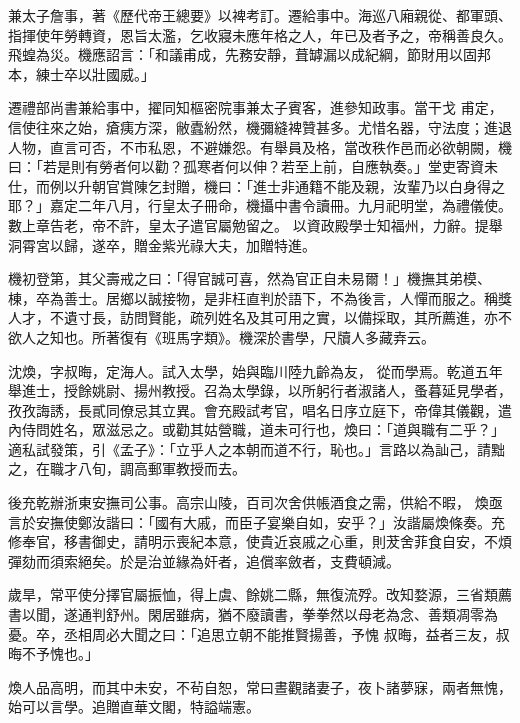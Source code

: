 \begin{pinyinscope}
 兼太子詹事，著《歷代帝王總要》以裨考訂。遷給事中。海巡八廂親從、都軍頭、指揮使年勞轉資，恩旨太濫，乞收寢未應年格之人，年已及者予之，帝稱善良久。飛蝗為災。機應詔言：「和議甫成，先務安靜，葺罅漏以成紀綱，節財用以固邦本，練士卒以壯國威。」



 遷禮部尚書兼給事中，擢同知樞密院事兼太子賓客，進參知政事。當干戈
 甫定，信使往來之始，瘡痍方深，敝蠹紛然，機彌縫裨贊甚多。尤惜名器，守法度；進退人物，直言可否，不市私恩，不避嫌怨。有舉員及格，當改秩作邑而必欲朝闕，機曰：「若是則有勞者何以勸？孤寒者何以伸？若至上前，自應執奏。」堂吏寄資未仕，而例以升朝官賞陳乞封贈，機曰：「進士非通籍不能及親，汝輩乃以白身得之耶？」嘉定二年八月，行皇太子冊命，機攝中書令讀冊。九月祀明堂，為禮儀使。數上章告老，帝不許，皇太子遣官屬勉留之。
 以資政殿學士知福州，力辭。提舉洞霄宮以歸，遂卒，贈金紫光祿大夫，加贈特進。



 機初登第，其父壽戒之曰：「得官誠可喜，然為官正自未易爾！」機撫其弟模、棟，卒為善士。居鄉以誠接物，是非枉直判於語下，不為後言，人憚而服之。稱獎人才，不遺寸長，訪問賢能，疏列姓名及其可用之實，以備採取，其所薦進，亦不欲人之知也。所著復有《班馬字類》。機深於書學，尺牘人多藏弆云。



 沈煥，字叔晦，定海人。試入太學，始與臨川陸九齡為友，
 從而學焉。乾道五年舉進士，授餘姚尉、揚州教授。召為太學錄，以所躬行者淑諸人，蚤暮延見學者，孜孜誨誘，長貳同僚忌其立異。會充殿試考官，唱名日序立庭下，帝偉其儀觀，遣內侍問姓名，眾滋忌之。或勸其姑營職，道未可行也，煥曰：「道與職有二乎？」適私試發策，引《孟子》：「立乎人之本朝而道不行，恥也。」言路以為訕己，請黜之，在職才八旬，調高郵軍教授而去。



 後充乾辦浙東安撫司公事。高宗山陵，百司次舍供帳酒食之需，供給不暇，
 煥亟言於安撫使鄭汝諧曰：「國有大戚，而臣子宴樂自如，安乎？」汝諧屬煥條奏。充修奉官，移書御史，請明示喪紀本意，使貴近哀戚之心重，則茇舍菲食自安，不煩彈劾而須索絕矣。於是治並緣為奸者，追償率斂者，支費頓減。



 歲旱，常平使分擇官屬振恤，得上虞、餘姚二縣，無復流殍。改知婺源，三省類薦書以聞，遂通判舒州。閑居雖病，猶不廢讀書，拳拳然以母老為念、善類凋零為憂。卒，丞相周必大聞之曰：「追思立朝不能推賢揚善，予愧
 叔晦，益者三友，叔晦不予愧也。」



 煥人品高明，而其中未安，不茍自恕，常曰晝觀諸妻子，夜卜諸夢寐，兩者無愧，始可以言學。追贈直華文閣，特謚端憲。




\end{pinyinscope}
